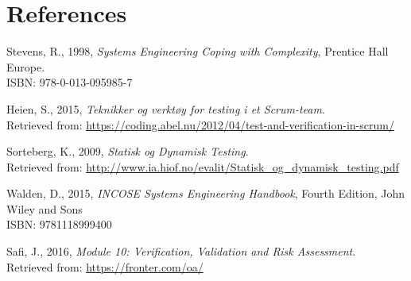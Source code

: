 \section{References}
\begin{thebibliography}{10}
    Stevens, R., 1998, \textit{Systems Engineering Coping with Complexity}, Prentice Hall Europe. \\
    \qquad ISBN: 978-0-013-095985-7
    
    Heien, S., 2015, \textit{Teknikker og verktøy for testing i et Scrum-team}. \\
    \qquad Retrieved from: \url{https://coding.abel.nu/2012/04/test-and-verification-in-scrum/}
    
    Sorteberg, K., 2009, \textit{Statisk og Dynamisk Testing}. \\
    \qquad Retrieved from: \url{http://www.ia.hiof.no/evalit/Statisk_og_dynamisk_testing.pdf}
    
    Walden, D., 2015, \textit{INCOSE Systems Engineering Handbook}, Fourth Edition, John Wiley and Sons\\
    \qquad ISBN: 9781118999400 
    
    Safi, J., 2016, \textit{Module 10: Verification, Validation and Risk Assessment}. \\
    \qquad Retrieved from: \url{https://fronter.com/oa/}
    
\end{thebibliography}